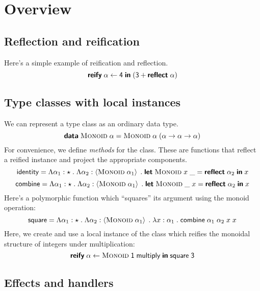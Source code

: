 \section{Overview}

  \subsection{Reflection and reification}

    Here's a simple example of reification and reflection.
    \[ \textsf{\textbf{reify}} \; \alpha \leftarrow \textsf{4} \; \textsf{\textbf{in}} \; \mathopen{}\left( \textsf{3} + \textsf{\textbf{reflect}} \; \alpha \right)\mathclose{} \]

  \subsection{Type classes with local instances}

    We can represent a type class as an ordinary data type.
    \[ \textsf{\textbf{data}} \; \textsf{\textsc{Monoid}} \; \alpha = \textsf{\textsc{Monoid}} \; \alpha \; \mathopen{}\left( \alpha \rightarrow \alpha \rightarrow \alpha \right)\mathclose{} \]
    For convenience, we define \emph{methods} for the class. These are functions that reflect a reified instance and project the appropriate components.
    \[ \textsf{identity} = \Lambda \alpha_1 : \star \; . \; \Lambda \alpha_2 : \left\langle \textsf{\textsc{Monoid}} \; \alpha_1 \right\rangle \; . \; \textsf{\textbf{let}} \; \textsf{\textsc{Monoid}} \; x \; \_ = \textsf{\textbf{reflect}} \; \alpha_2 \; \textsf{\textbf{in}} \; x \]
    \[ \textsf{combine} = \Lambda \alpha_1 : \star \; . \; \Lambda \alpha_2 : \left\langle \textsf{\textsc{Monoid}} \; \alpha_1 \right\rangle \; . \; \textsf{\textbf{let}} \; \textsf{\textsc{Monoid}} \; \_ \; x = \textsf{\textbf{reflect}} \; \alpha_2 \; \textsf{\textbf{in}} \; x \]
    Here's a polymorphic function which ``squares'' its argument using the monoid operation:
    \[ \textsf{square} = \Lambda \alpha_1 : \star \; . \; \Lambda \alpha_2 : \left\langle \textsf{\textsc{Monoid}} \; \alpha_1 \right\rangle \; . \; \lambda x : \alpha_1 \; . \; \textsf{combine} \; \alpha_1 \; \alpha_2 \; x \; x \]
    Here, we create and use a local instance of the class which reifies the monoidal structure of integers under multiplication:
    \[ \textsf{\textbf{reify}} \; \alpha \leftarrow \textsf{\textsc{Monoid}} \; \textsf{1} \; \textsf{multiply} \; \textsf{\textbf{in}} \; \textsf{square} \; \textsf{3} \]

  \subsection{Effects and handlers}
